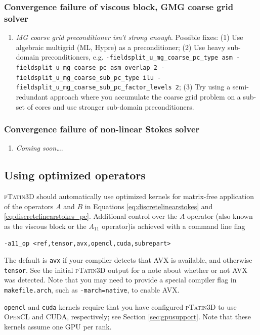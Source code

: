 \documentclass[paper=a4, fontsize=10pt,twoside]{scrartcl}
\newcommand{\ptat}{{{\textsc{pTatin3D}}}}
\newcommand{\CUDA}{{{\textsc{CUDA}}}}
\newcommand{\OpenCL}{{{\textsc{OpenCL}}}}
\newcommand{\unix}[1]{\texttt{\footnotesize #1}}
\begin{document}
\subsubsection*{Convergence failure of viscous block, GMG coarse grid solver}
\begin{enumerate}
	\item \emph{MG coarse grid preconditioner isn't strong enough}. Possible fixes:
	(1) Use algebraic multigrid (ML, Hypre) as a preconditioner;
	(2) Use heavy sub-domain preconditioners, e.g. \unix{-fieldsplit\_u\_mg\_coarse\_pc\_type asm -fieldsplit\_u\_mg\_coarse\_pc\_asm\_overlap 2
	-fieldsplit\_u\_mg\_coarse\_sub\_pc\_type ilu -fieldsplit\_u\_mg\_coarse\_sub\_pc\_factor\_levels 2};
	(3) Try using a semi-redundant approach where you accumulate the coarse grid problem on a sub-set of cores and use stronger sub-domain preconditioners.
\end{enumerate}

\subsubsection*{Convergence failure of non-linear Stokes solver}
\begin{enumerate}
	\item \emph{Coming soon\dots}.
\end{enumerate}

\subsection{Using optimized operators}
\ptat{} should automatically use optimized kernels for matrix-free application of the operators $A$ and $B$ in Equations \ref{eq:discretelinearstokes} and \ref{eq:discretelinearstokes_pc}. Additional control over the $A$ operator (also known as the viscous block or the $A_{11}$ operator)is achieved with a command line flag
\begin{lstlisting}
-a11_op <ref,tensor,avx,opencl,cuda,subrepart>
\end{lstlisting}
The default is \texttt{avx} if your compiler detects that AVX is available, and otherwise \texttt{tensor}. See the initial \ptat{} output for a note about whether or not AVX was detected. Note that you may need to provide a special compiler flag in \texttt{makefile.arch}, such as \texttt{-march=native}, to enable AVX.

\texttt{opencl} and \texttt{cuda} kernels require that you have configured \ptat{} to use \OpenCL{} and \CUDA{}, respectively; see Section \ref{sec:gpusupport}. Note that these kernels assume one GPU per rank.
\end{document}
